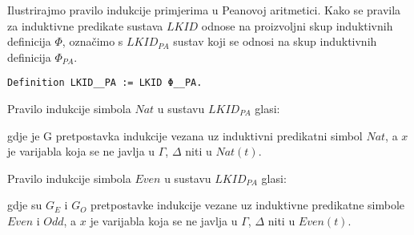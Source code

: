 Ilustrirajmo pravilo indukcije primjerima u Peanovoj aritmetici.
Kako se pravila za induktivne predikate sustava \(\mathit{LKID}\) odnose na proizvoljni skup induktivnih definicija \(\Phi\),
označimo s \(\mathit{LKID}_{\mathit{PA}}\)  sustav koji se odnosi na skup induktivnih definicija \(\Phi_{\mathit{PA}}\).
\begin{verbatim}
Definition LKID__PA := LKID Φ__PA.
\end{verbatim}
\begin{example}
  Pravilo indukcije simbola \(\mathit{Nat}\)
  u sustavu \(\mathit{LKID}_{\mathit{PA}}\) glasi:
  \begin{prooftree}
  \end{prooftree}
  \noindent gdje je G pretpostavka indukcije vezana uz induktivni predikatni simbol \(\mathit{Nat}\),
  a \(x\) je varijabla koja se ne javlja u \(\Gamma\), \(\Delta\) niti u \(\mathit{Nat}(t)\).
\end{example}

\begin{example}
  Pravilo indukcije simbola  \(\mathit{Even}\)
  u sustavu \(\mathit{LKID}_{\mathit{PA}}\) glasi:
  \begin{small}
    \begin{prooftree}
    \end{prooftree}
  \end{small}
  \noindent gdje su \(G_{E}\) i \(G_{O}\) pretpostavke indukcije vezane uz
  induktivne predikatne simbole \(\mathit{Even}\) i \(\mathit{Odd}\),
  a \(x\) je varijabla koja se ne javlja u \(\Gamma\), \(\Delta\) niti u \(\mathit{Even}(t)\).
\end{example}

